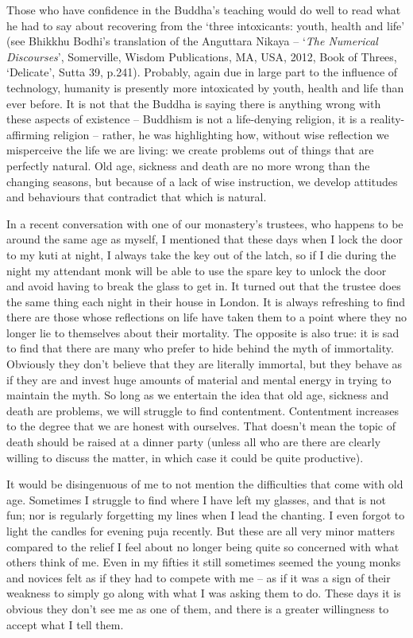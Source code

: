 Those who have confidence in the Buddha's teaching would do well to read
what he had to say about recovering from the `three intoxicants: youth,
health and life'
(see Bhikkhu Bodhi's translation of the Anguttara Nikaya -- `\emph{The Numerical
Discourses}', Somerville, Wisdom Publications, MA, USA, 2012, Book of Threes,
`Delicate', Sutta 39, p.241).
Probably, again due in large part to the influence
of technology, humanity is presently more intoxicated by youth, health
and life than ever before. It is not that the Buddha is saying there is
anything wrong with these aspects of existence -- Buddhism is not a
life-denying religion, it is a reality-affirming religion -- rather, he
was highlighting how, without wise reflection we misperceive the life we
are living: we create problems out of things that are perfectly natural.
Old age, sickness and death are no more wrong than the changing seasons,
but because of a lack of wise instruction, we develop attitudes and
behaviours that contradict that which is natural.

In a recent conversation with one of our monastery's trustees, who
happens to be around the same age as myself, I mentioned that these days
when I lock the door to my kuti at night, I always take the key out of
the latch, so if I die during the night my attendant monk will be able
to use the spare key to unlock the door and avoid having to break the
glass to get in. It turned out that the trustee does the same thing each
night in their house in London. It is always refreshing to find there
are those whose reflections on life have taken them to a point where
they no longer lie to themselves about their mortality. The opposite is
also true: it is sad to find that there are many who prefer to hide
behind the myth of immortality. Obviously they don't believe that they
are literally immortal, but they behave as if they are and invest huge
amounts of material and mental energy in trying to maintain the myth. So
long as we entertain the idea that old age, sickness and death are
problems, we will struggle to find contentment. Contentment increases to
the degree that we are honest with ourselves. That doesn't mean the
topic of death should be raised at a dinner party (unless all who are
there are clearly willing to discuss the matter, in which case it could
be quite productive).

It would be disingenuous of me to not mention the difficulties that come
with old age. Sometimes I struggle to find where I have left my glasses, and that is not fun; nor is regularly forgetting my lines when I lead the chanting. I even forgot to light the candles for evening puja
recently. But these are all very minor matters compared to the relief I
feel about no longer being quite so concerned with what others think of
me. Even in my fifties it still sometimes seemed the young monks and
novices felt as if they had to compete with me -- as if it was a sign of
their weakness to simply go along with what I was asking them to do.
These days it is obvious they don't see me as one of them, and there is
a greater willingness to accept what I tell them.

